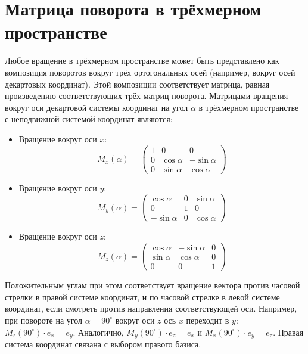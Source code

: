 \documentclass{book}
\begin{document}
\sloppypar\section*{Матрица поворота в трёхмерном пространстве}
Любое вращение в трёхмерном пространстве может быть представлено как композиция поворотов вокруг трёх ортогональных осей (например, вокруг осей декартовых координат). Этой композиции соответствует матрица, равная произведению соответствующих трёх матриц поворота.
Матрицами вращения вокруг оси декартовой системы координат на угол $\alpha$  в трёхмерном пространстве с неподвижной системой координат являются:
\begin{itemize}
    \item Вращение вокруг оси $x$:
    $$M_{x}(\alpha)=\begin{pmatrix}
    1 & 0 & 0\\
    0 & \cos{\alpha} &-\sin{\alpha} \\
    0 & \sin{\alpha} & \cos{\alpha}
    
    
    \end{pmatrix}$$
    \item Вращение вокруг оси $y$:
    $$M_{y}(\alpha)=\begin{pmatrix}
    \cos{\alpha} & 0 & \sin{\alpha}\\
    0 & 1 & 0 \\
    -\sin{\alpha} & 0 & \cos{\alpha}
    
    
    \end{pmatrix}$$
    \item Вращение вокруг оси $z$:
    $$M_{z}(\alpha)=\begin{pmatrix}
    \cos{\alpha} & -\sin{\alpha} & 0\\
    \sin{\alpha} & \cos{\alpha} & 0 \\
    0 & 0 & 1
    
    
    \end{pmatrix}$$
    
\end{itemize}

Положительным углам при этом соответствует вращение вектора против часовой стрелки в правой системе координат, и по часовой стрелке в левой системе координат, если смотреть против направления соответствующей оси. Например, при повороте на угол $\alpha =90^{\circ}$ вокруг оси $z$ ось $x$ переходит в $y$: $M_{z}(90^{\circ })\cdot e_{x}=e_{y}$. Аналогично, $M_{y}(90^{\circ })\cdot e_{z}=e_{x}$ и $M_{x}(90^{\circ })\cdot e_{y}=e_{z}$. Правая система координат связана с выбором правого базиса.
\end{document}
